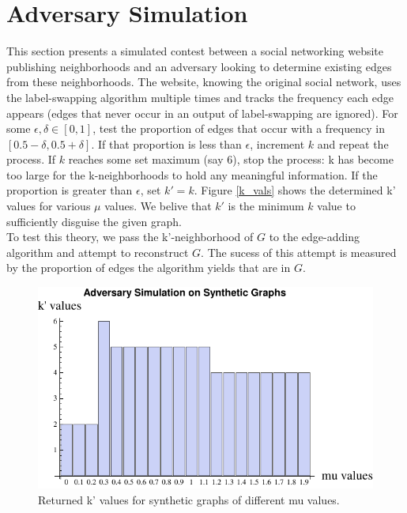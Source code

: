\section{Adversary Simulation}

\noindent This section presents a simulated contest between a social networking website publishing neighborhoods and an adversary looking to determine existing edges from these neighborhoods. The website, knowing the original social network, uses the label-swapping algorithm multiple times and tracks the frequency each edge appears (edges that never occur in an output of label-swapping are ignored). For some $\epsilon,\delta \in [0,1]$, test the proportion of edges that occur with a frequency in $[0.5-\delta,0.5+\delta]$. If that proportion is less than $\epsilon$, increment $k$ and repeat the process. If $k$ reaches some set maximum (say 6), stop the process: k has become too large for the k-neighborhoods to hold any meaningful information. If the proportion is greater than $\epsilon$, set $k' = k$.  Figure \ref{k_vals} shows the determined k' values for various $\mu$ values. We belive that $k'$ is the minimum $k$ value to sufficiently disguise the given graph. \\

\indent To test this theory, we pass the k'-neighborhood of $G$ to the edge-adding algorithm and attempt to reconstruct $G$. The sucess of this attempt is measured by the proportion of edges the algorithm yields that are in $G$.\\

\begin{figure}[H]
  \label{k_vals}
\centerline{\includegraphics[scale=1]{adversary_graph.pdf}}
  \caption{Returned k' values for synthetic graphs of different mu values.}
  \label{fig:k'_values}
\end{figure}

